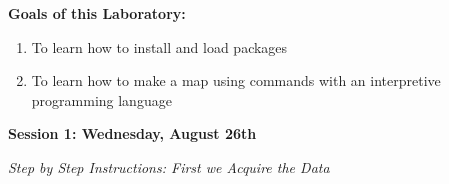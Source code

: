 \documentclass{article}
\begin{document}
\setlength{\leftskip}{0cm}

\large{\textbf{Goals of this Laboratory:}}

\begin{enumerate}[leftmargin=15mm]

\item To learn how to install and load packages

\item To learn how to make a map using commands with an interpretive programming language

\end{enumerate}









\large{\textbf{Session 1: Wednesday, August 26th}}

\vspace{4mm}
\setlength{\leftskip}{1cm}
\textit{Step by Step Instructions: First we Acquire the Data}
\end{document}
